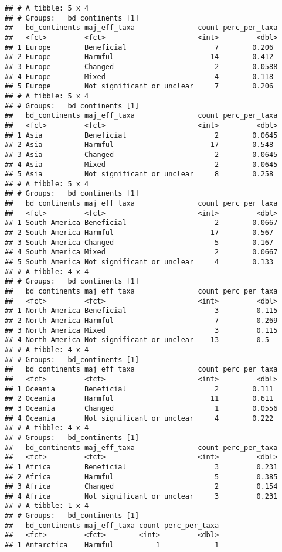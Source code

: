 \documentclass[
]{article}
\begin{document}
\begin{verbatim}
## # A tibble: 5 x 4
## # Groups:   bd_continents [1]
##   bd_continents maj_eff_taxa               count perc_per_taxa
##   <fct>         <fct>                      <int>         <dbl>
## 1 Europe        Beneficial                     7        0.206 
## 2 Europe        Harmful                       14        0.412 
## 3 Europe        Changed                        2        0.0588
## 4 Europe        Mixed                          4        0.118 
## 5 Europe        Not significant or unclear     7        0.206 
## # A tibble: 5 x 4
## # Groups:   bd_continents [1]
##   bd_continents maj_eff_taxa               count perc_per_taxa
##   <fct>         <fct>                      <int>         <dbl>
## 1 Asia          Beneficial                     2        0.0645
## 2 Asia          Harmful                       17        0.548 
## 3 Asia          Changed                        2        0.0645
## 4 Asia          Mixed                          2        0.0645
## 5 Asia          Not significant or unclear     8        0.258 
## # A tibble: 5 x 4
## # Groups:   bd_continents [1]
##   bd_continents maj_eff_taxa               count perc_per_taxa
##   <fct>         <fct>                      <int>         <dbl>
## 1 South America Beneficial                     2        0.0667
## 2 South America Harmful                       17        0.567 
## 3 South America Changed                        5        0.167 
## 4 South America Mixed                          2        0.0667
## 5 South America Not significant or unclear     4        0.133 
## # A tibble: 4 x 4
## # Groups:   bd_continents [1]
##   bd_continents maj_eff_taxa               count perc_per_taxa
##   <fct>         <fct>                      <int>         <dbl>
## 1 North America Beneficial                     3         0.115
## 2 North America Harmful                        7         0.269
## 3 North America Mixed                          3         0.115
## 4 North America Not significant or unclear    13         0.5  
## # A tibble: 4 x 4
## # Groups:   bd_continents [1]
##   bd_continents maj_eff_taxa               count perc_per_taxa
##   <fct>         <fct>                      <int>         <dbl>
## 1 Oceania       Beneficial                     2        0.111 
## 2 Oceania       Harmful                       11        0.611 
## 3 Oceania       Changed                        1        0.0556
## 4 Oceania       Not significant or unclear     4        0.222 
## # A tibble: 4 x 4
## # Groups:   bd_continents [1]
##   bd_continents maj_eff_taxa               count perc_per_taxa
##   <fct>         <fct>                      <int>         <dbl>
## 1 Africa        Beneficial                     3         0.231
## 2 Africa        Harmful                        5         0.385
## 3 Africa        Changed                        2         0.154
## 4 Africa        Not significant or unclear     3         0.231
## # A tibble: 1 x 4
## # Groups:   bd_continents [1]
##   bd_continents maj_eff_taxa count perc_per_taxa
##   <fct>         <fct>        <int>         <dbl>
## 1 Antarctica    Harmful          1             1
\end{verbatim}
\end{document}
